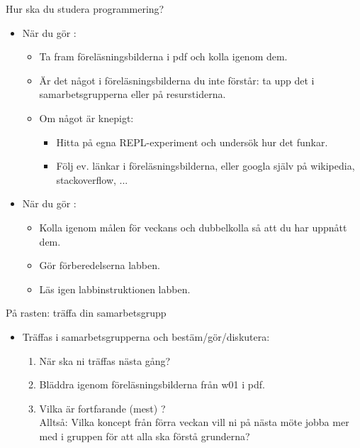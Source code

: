 \begin{Slide}{Hur ska du studera programmering?}
\begin{itemize}
\item När du gör :
\begin{itemize}
\item Ta fram föreläsningsbilderna i pdf och kolla igenom dem.
\item Är det något i föreläsningsbilderna du inte förstår: ta upp det i samarbetsgrupperna eller på resurstiderna.
\item Om något är knepigt: 
\begin{itemize}
\item Hitta på egna REPL-experiment och undersök hur det funkar.
\item Följ ev. länkar i föreläsningsbilderna, eller googla själv på wikipedia, stackoverflow, ...
\end{itemize}
\end{itemize}

\item När du gör :
\begin{itemize}
\item Kolla igenom målen för veckans  och dubbelkolla så att du har uppnått dem.
\item Gör förberedelserna  labben.
\item Läs igen  labbinstruktionen  labben.
\end{itemize}
\end{itemize}



\end{Slide}

\begin{Slide}{På rasten: träffa din samarbetsgrupp}
\begin{itemize}

\item Träffas i samarbetsgrupperna och bestäm/gör/diskutera:
\begin{enumerate}
\item När ska ni träffas nästa gång?
\item Bläddra igenom föreläsningsbilderna från w01 i pdf.
\item Vilka  är fortfarande (mest) ? \\Alltså: Vilka koncept från förra veckan vill ni på nästa möte jobba mer med i gruppen för att alla ska förstå grunderna?
\end{enumerate}

\end{itemize}

\end{Slide}


